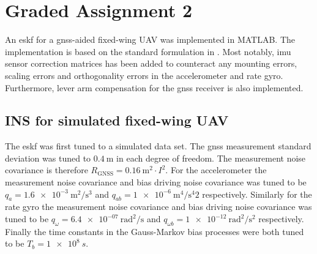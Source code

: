 \section{Graded Assignment 2}\label{sec:graded_assignment_2}


An \acrfull{eskf} for a \acrshort{gnss}-aided fixed-wing UAV was implemented in MATLAB. The implementation is based on the standard formulation in \cite{Sola}. Most notably, \acrshort{imu} sensor correction matrices has been added to counteract any mounting errors, scaling errors and orthogonality errors in the accelerometer and rate gyro. Furthermore, lever arm compensation for the \acrshort{gnss} receiver is also implemented.

\subsection{INS for simulated fixed-wing UAV}





The \acrshort{eskf} was first tuned to a simulated data set. The \acrshort{gnss} measurement standard deviation was tuned to $\SI{0.4}{\meter}$ in each degree of freedom. The measurement noise covariance is therefore $R_{\text{GNSS}} = \SI{0.16}{\meter\squared} \cdot I^2$. For the accelerometer the measurement noise covariance and bias driving noise covariance was tuned to be $q_{a} = \SI{1.6e-3}{\meter\squared\per\second\cubed}$ and $ q_{ab} = \SI{1e-6}{\meter\tothe{4}\per\second\tothe{4}}2$ respectively. Similarly for the rate gyro the measurement noise covariance and bias driving noise covariance was tuned to be $q_{\omega} = \SI{6.4e-07}{\radian\squared\per\second}$ and $q_{\omega b} = \SI{1e-12}{\radian\squared\per\second\squared}$ respectively. Finally the time constants in the Gauss-Markov bias processes were both tuned to be $T_b = \SI{1e8}{s}$.

